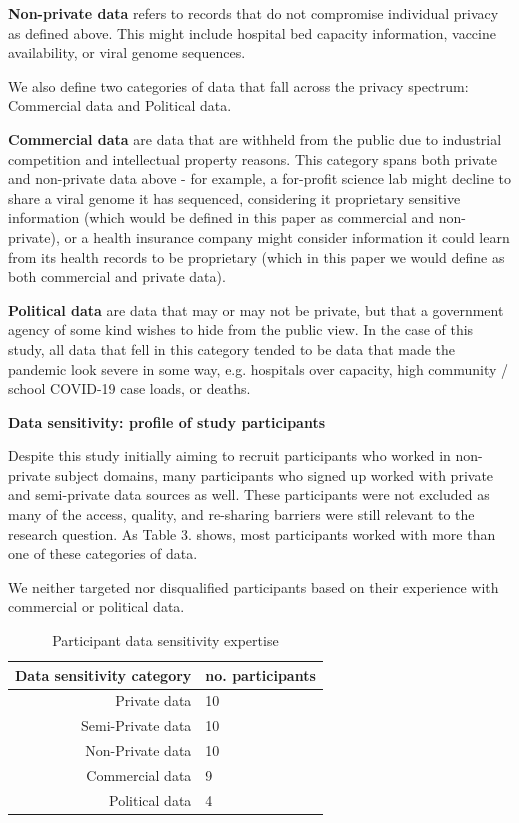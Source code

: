 \documentclass{CUP-JNL-DAP}%
\begin{document}
\textbf{Non-private data} refers to records that do not compromise individual privacy as defined above. This might include hospital bed capacity information, vaccine availability, or viral genome sequences.

We also define two categories of data that fall across the privacy spectrum: Commercial data and Political data.

\textbf{Commercial data} are data that are withheld from the public due to industrial competition and intellectual property reasons. This category spans both private and non-private data above - for example, a for-profit science lab might decline to share a viral genome it has sequenced, considering it proprietary sensitive information (which would be defined in this paper as commercial and non-private), or a health insurance company might consider information it could learn from its health records to be proprietary (which in this paper we would define as both commercial and private data).

\textbf{Political data} are data that may or may not be private, but that a government agency of some kind wishes to hide from the public view. In the case of this study, all data that fell in this category tended to be data that made the pandemic look severe in some way, e.g. hospitals over capacity, high community / school COVID-19 case loads, or deaths. 

\textbf{Data sensitivity: profile of study participants}

Despite this study initially aiming to recruit participants who worked in non-private subject domains, many participants who signed up worked with private and semi-private data sources as well. These participants were not excluded as many of the access, quality, and re-sharing barriers were still relevant to the research question. As Table 3. shows, most participants worked with more than one of these categories of data. 

We neither targeted nor disqualified participants based on their experience with commercial or political data. 

\begin{table}[h!]
  \begin{center}
    \caption{Participant data sensitivity expertise}
    \label{tab:data_sensitivity}
    \begin{tabular}{r|l}  %
      \textbf{Data sensitivity category} & \textbf{no. participants} \\
      \hline
      Private data & 10\\
      Semi-Private data & 10\\
      Non-Private data & 10 \\
      Commercial data & 9\\ 
      Political data & 4\\ 
    \end{tabular}
  \end{center}
\end{table}
\end{document}
